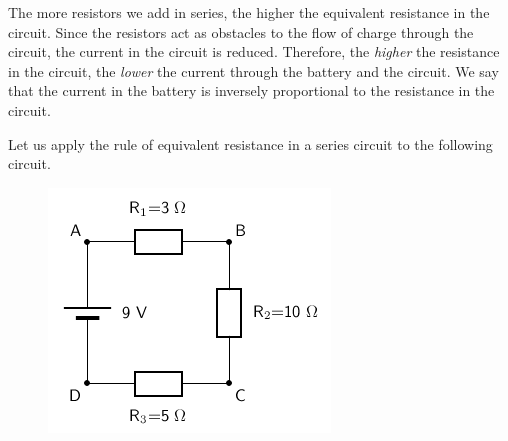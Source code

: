           \label{m38776*id64719}The more resistors we add in series, the higher the equivalent resistance in the circuit. Since the resistors act as obstacles to the flow of charge through the circuit, the current in the circuit is reduced. Therefore, the \textsl{higher} the resistance in the circuit, the \textsl{lower} the current through the battery and the circuit. We say that the current in the battery is inversely proportional to the resistance in the circuit. 

Let us apply the rule of equivalent resistance in a series circuit to the following circuit.\par 
          \label{m38776*id64722}
            
    \setcounter{subfigure}{0}


	\begin{figure}[H] %
    \begin{center}
    \label{m38776*id64726!!!underscore!!!media}\label{m38776*id64726!!!underscore!!!printimage}\includegraphics[width=0.4\columnwidth]{col11305.imgs/m38776_PG11C9_008.png} %
        
      \vspace{2pt}
    \vspace{.1in}
    
    \end{center}

 \end{figure}   

    \addtocounter{footnote}{-0}
    
